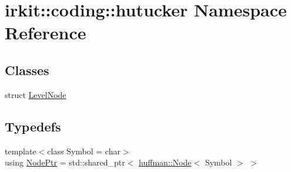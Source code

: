 \hypertarget{namespaceirkit_1_1coding_1_1hutucker}{}\section{irkit\+:\+:coding\+:\+:hutucker Namespace Reference}
\label{namespaceirkit_1_1coding_1_1hutucker}
\subsection*{Classes}
\begin{DoxyCompactItemize}
\item 
struct \mbox{\hyperlink{structirkit_1_1coding_1_1hutucker_1_1LevelNode}{Level\+Node}}
\end{DoxyCompactItemize}
\subsection*{Typedefs}
\begin{DoxyCompactItemize}
\item 
{\footnotesize template$<$class Symbol  = char$>$ }\\using \mbox{\hyperlink{namespaceirkit_1_1coding_1_1hutucker_a3fd5bcbd5c6d608f75e0afbb7f171899}{Node\+Ptr}} = std\+::shared\+\_\+ptr$<$ \mbox{\hyperlink{structirkit_1_1coding_1_1huffman_1_1Node}{huffman\+::\+Node}}$<$ Symbol $>$ $>$
\end{DoxyCompactItemize}
